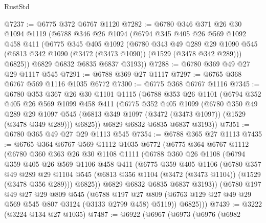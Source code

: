 \begin{lexlean}{RustStd}
\begin{coremodule}
@7237 := @6775 @372 @6767 @1120
@7282 := @6780
    @346
    @371
    @26
    @30
    @1094
    @1119
    (@6788
      @346
      @26
      @1094
      (@6794
        @345
        @405
        @26
        @569
        @1092
        @458
        @411
        (@6775
          @345
          @405
          @1092
          (@6780
            @343
            @49
            @289
            @29
            @1090
            @545
            (@6813 @342 @1090 (@3472 (@3473 @1090)) (@1529 (@3478 @342 @289)))
            @6825))
        @6829
        @6832
        @6835
        @6837
        @3193))
@7288 := @6780 @369 @49 @27 @29 @1117 @545
@7291 := @6788 @369 @27 @1117
@7297 := @6765 @368 @6767 @569 @1116 @1035 @6772
@7300 := @6775 @368 @6767 @1116
@7345 := @6780
    @353
    @367
    @26
    @30
    @1101
    @1115
    (@6788
      @353
      @26
      @1101
      (@6794
        @352
        @405
        @26
        @569
        @1099
        @458
        @411
        (@6775
          @352
          @405
          @1099
          (@6780
            @350
            @49
            @289
            @29
            @1097
            @545
            (@6813 @349 @1097 (@3472 (@3473 @1097)) (@1529 (@3478 @349 @289)))
            @6825))
        @6829
        @6832
        @6835
        @6837
        @3193))
@7351 := @6780 @365 @49 @27 @29 @1113 @545
@7354 := @6788 @365 @27 @1113
@7435 := @6765
    @364
    @6767
    @569
    @1112
    @1035
    @6772
    (@6775
      @364
      @6767
      @1112
      (@6780
        @360
        @363
        @26
        @30
        @1108
        @1111
        (@6788
          @360
          @26
          @1108
          (@6794
            @359
            @405
            @26
            @569
            @1106
            @458
            @411
            (@6775
              @359
              @405
              @1106
              (@6780
                @357
                @49
                @289
                @29
                @1104
                @545
                (@6813 @356 @1104 (@3472 (@3473 @1104)) (@1529 (@3478 @356 @289)))
                @6825))
            @6829
            @6832
            @6835
            @6837
            @3193))
        (@6780
          @197
          @49
          @27
          @29
          @809
          @545
          (@6788
            @197
            @27
            @809
            (@6763 @129 @27 @49 @29 @569 @545 @807 @3124 (@3133 @2799 @458) @5119))
          @6825)))
@7439 := @3222 (@3224 @134 @27 @1035)
@7487 := @6922
    (@6967
      (@6973
        (@6976
          (@6982

\end{coremodule}
\end{lexlean}
